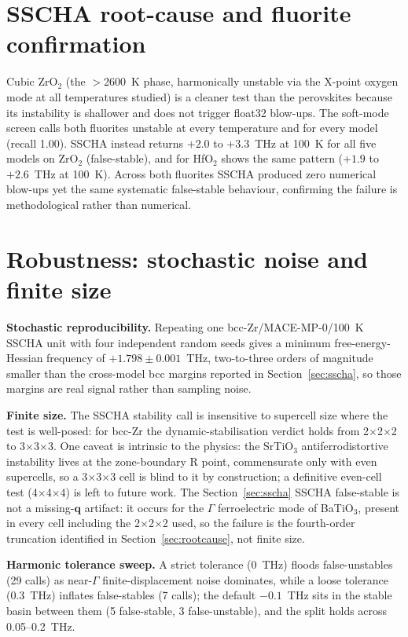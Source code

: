 \documentclass{article}
\begin{document}
\section{SSCHA root-cause and fluorite confirmation}
\label{app:fluorites}
Cubic ZrO$_2$ (the $>$2600~K phase, harmonically unstable via the X-point oxygen mode at all temperatures studied) is a cleaner test than the perovskites because its instability is shallower and does not trigger float32 blow-ups. The soft-mode screen calls both fluorites unstable at every temperature and for every model (recall 1.00). SSCHA instead returns $+2.0$ to $+3.3$~THz at 100~K for all five models on ZrO$_2$ (false-stable), and for HfO$_2$ shows the same pattern ($+1.9$ to $+2.6$~THz at 100~K). Across both fluorites SSCHA produced zero numerical blow-ups yet the same systematic false-stable behaviour, confirming the failure is methodological rather than numerical.

\section{Robustness: stochastic noise and finite size}
\label{app:robustness}
\textbf{Stochastic reproducibility.} Repeating one bcc-Zr/MACE-MP-0/100~K SSCHA unit with four independent random seeds gives a minimum free-energy-Hessian frequency of $+1.798\pm0.001$~THz, two-to-three orders of magnitude smaller than the cross-model bcc margins reported in Section~\ref{sec:sscha}, so those margins are real signal rather than sampling noise.

\textbf{Finite size.} The SSCHA stability call is insensitive to supercell size where the test is well-posed: for bcc-Zr the dynamic-stabilisation verdict holds from 2$\times$2$\times$2 to 3$\times$3$\times$3. One caveat is intrinsic to the physics: the SrTiO$_3$ antiferrodistortive instability lives at the zone-boundary R point, commensurate only with even supercells, so a 3$\times$3$\times$3 cell is blind to it by construction; a definitive even-cell test (4$\times$4$\times$4) is left to future work. The Section~\ref{sec:sscha} SSCHA false-stable is not a missing-$\mathbf{q}$ artifact: it occurs for the $\Gamma$ ferroelectric mode of BaTiO$_3$, present in every cell including the 2$\times$2$\times$2 used, so the failure is the fourth-order truncation identified in Section~\ref{sec:rootcause}, not finite size.

\textbf{Harmonic tolerance sweep.} A strict tolerance (0~THz) floods false-unstables (29 calls) as near-$\Gamma$ finite-displacement noise dominates, while a loose tolerance (0.3~THz) inflates false-stables (7 calls); the default $-0.1$~THz sits in the stable basin between them (5 false-stable, 3 false-unstable), and the split holds across 0.05--0.2~THz.

\newpage

\end{document}

